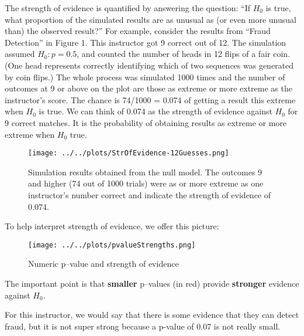       The strength of evidence is quantified by answering the
      question: ``If $H_0$ is true, what proportion of the simulated
      results are as unusual as (or even more unusual than) the
      observed result?'' 
      For example, consider the results from ``Fraud Detection''  in
      Figure 1. This instructor got 9 correct out of 12.  The
      simulation assumed $H_0: p = 0.5$, and counted the number of
      heads in 12 flips of a fair coin. (One head represents correctly
      identifying which of two sequences was generated by coin flips.)
      The whole process was simulated 1000 times and the number of
      outcomes at 9 or above on the plot are those as extreme or more
      extreme as the instructor's score. The chance is 74/1000 =
      0.074 of getting a result this extreme when $H_0$ is
      true.  We can think of 0.074 as the strength of evidence against
      $H_0$  for 9 correct matches. It is
      the probability of obtaining results as extreme or more extreme
      when $H_0$ true.
 \begin{figure}[h]
   \centering
  \texttt{[image: ../../plots/StrOfEvidence-12Guesses.png]}

   \caption{ Simulation results obtained from the null model. The
      outcomes 9 and higher (74 out of 1000 trials) were as or more extreme
      as one instructor's number correct and indicate the strength of
      evidence of 0.074. }
   \label{fig:SOE-12}
 \end{figure}


 To help interpret strength of evidence, we offer this picture:
 \begin{figure}[h]
   \centering
\texttt{[image: ../../plots/pvalueStrengths.png]}
   \caption{Numeric p--value and strength of evidence}
   \label{fig:SOE-pvalue}
 \end{figure}

  The important point is that {\bf smaller} p--values (in red) provide {\bf
    stronger} evidence against $H_0$. 

  For this instructor, we would say that there is some evidence that
  they can detect fraud, but it is not super strong because a p-value
  of 0.07 is not really small.

